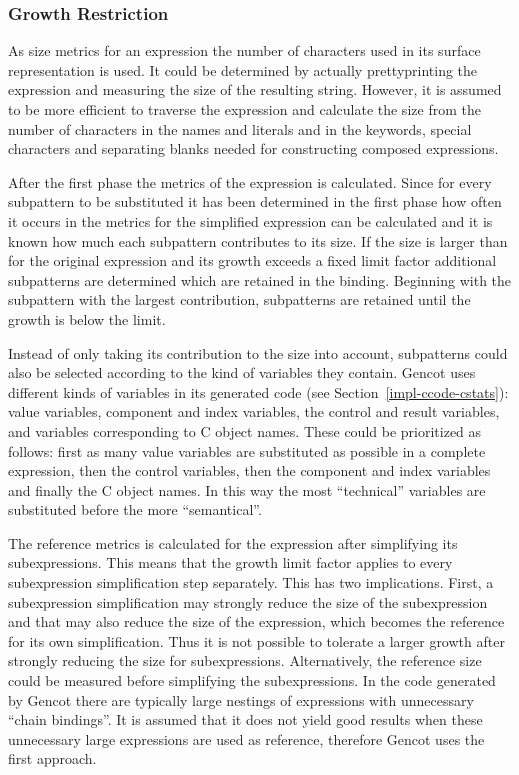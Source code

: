 \subsubsection{Growth Restriction}

As size metrics for an expression the number of characters used in its surface representation is used. It could be determined
by actually prettyprinting the expression and measuring the size of the resulting string. However, it is assumed to be more
efficient to traverse the expression and calculate the size from the number of characters in the names and literals and in
the keywords, special characters and separating blanks needed for constructing composed expressions.

After the first phase the metrics of the  expression is calculated. Since for every subpattern to be substituted it 
has been determined in the first phase how often it occurs in  the metrics for the simplified expression can be 
calculated and it is known how much each subpattern contributes to its size. If the size is larger than for the original 
expression and its growth exceeds a fixed limit factor additional subpatterns are determined which are retained in the binding. 
Beginning with the subpattern with the largest contribution, subpatterns are retained until the growth is below the limit.

Instead of only taking its contribution to the size into account, subpatterns could also be selected according to the kind of
variables they contain. 
Gencot uses different kinds of variables in its generated code (see Section~\ref{impl-ccode-cstats}): value variables, component and 
index variables, the control and result variables, and variables corresponding to C object names. These could be prioritized
as follows: first as many value 
variables are substituted as possible in a complete expression, then the control variables, then the component and index variables and
finally the C object names. In this way the most ``technical'' variables are substituted before the more ``semantical''.

The reference metrics is calculated for the expression after simplifying its subexpressions. This means that the growth limit factor
applies to every subexpression simplification step separately. This has two implications. First, a subexpression simplification
may strongly reduce the size of the subexpression and that may also reduce the size of the  expression, which becomes 
the reference for its own simplification. Thus it is not possible to tolerate a larger growth after strongly reducing the size for
subexpressions. Alternatively, the reference size could be measured before simplifying the subexpressions. In the code generated
by Gencot there are typically large nestings of  expressions with unnecessary ``chain bindings''. It is assumed that it
does not yield good results when these unnecessary large expressions are used as reference, therefore Gencot uses the first approach.

